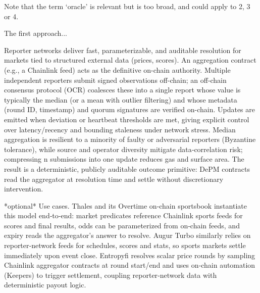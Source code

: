 Note that the term `oracle' is relevant but is too broad, and could apply to 2, 3 or 4. %


The first approach...





Reporter networks deliver fast, parameterizable, and auditable resolution for markets tied to structured external data (prices, scores). An aggregation contract (e.g., a Chainlink feed) acts as the definitive on-chain authority. Multiple independent reporters submit signed observations off-chain; an off‑chain consensus protocol (OCR) coalesces these into a single report whose value is typically the median (or a mean with outlier filtering) and whose metadata (round ID, timestamp) and quorum signatures are verified on-chain. Updates are emitted when deviation or heartbeat thresholds are met, giving explicit control over latency/recency and bounding staleness under network stress. Median aggregation is resilient to a minority of faulty or adversarial reporters (Byzantine tolerance), while source and operator diversity mitigate data‑correlation risk; compressing n submissions into one update reduces gas and surface area. The result is a deterministic, publicly auditable outcome primitive: DePM contracts read the aggregator at resolution time and settle without discretionary intervention.

*optional* Use cases. Thales and its Overtime on‑chain sportsbook instantiate this model end‑to‑end: market predicates reference Chainlink sports feeds for scores and final results, odds can be parameterized from on‑chain feeds, and expiry reads the aggregator’s answer to resolve. Augur Turbo similarly relies on reporter‑network feeds for schedules, scores and stats, so sports markets settle immediately upon event close. Entropyfi resolves scalar price rounds by sampling Chainlink aggregator contracts at round start/end and uses on‑chain automation (Keepers) to trigger settlement, coupling reporter‑network data with deterministic payout logic. 







